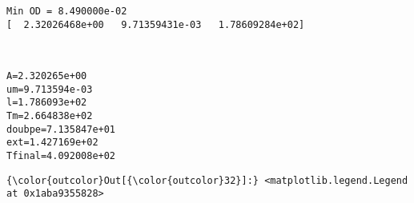\documentclass[11pt]{article}
\begin{document}
    \begin{Verbatim}[commandchars=\\\{\}]
Min OD = 8.490000e-02
[  2.32026468e+00   9.71359431e-03   1.78609284e+02]

    \end{Verbatim}

    \begin{center}
    \end{center}
    { \hspace*{\fill} \\}
    
    \begin{Verbatim}[commandchars=\\\{\}]
A=2.320265e+00
um=9.713594e-03
l=1.786093e+02
Tm=2.664838e+02
doubpe=7.135847e+01
ext=1.427169e+02
Tfinal=4.092008e+02

    \end{Verbatim}

            \begin{Verbatim}[commandchars=\\\{\}]
{\color{outcolor}Out[{\color{outcolor}32}]:} <matplotlib.legend.Legend at 0x1aba9355828>
\end{Verbatim}
        
    \begin{center}
    \end{center}
    { \hspace*{\fill} \\}
    
    \begin{center}
    \end{center}
    { \hspace*{\fill} \\}
    
\end{document}
